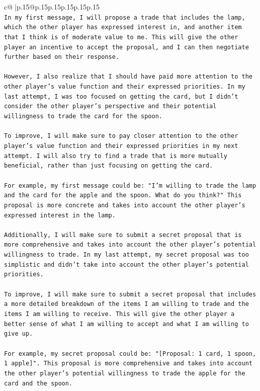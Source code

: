 \documentclass{article}
\begin{document}
{\begin{supertabular}{c@{$\;$}|p{.15\linewidth}@{}p{.15\linewidth}p{.15\linewidth}p{.15\linewidth}p{.15\linewidth}p{.15\linewidth}}
{{{\\ 
\texttt{In my first message, I will propose a trade that includes the lamp, which the other player has expressed interest in, and another item that I think is of moderate value to me. This will give the other player an incentive to accept the proposal, and I can then negotiate further based on their response.} \\
\\ 
\texttt{However, I also realize that I should have paid more attention to the other player's value function and their expressed priorities. In my last attempt, I was too focused on getting the card, but I didn't consider the other player's perspective and their potential willingness to trade the card for the spoon.} \\
\\ 
\texttt{To improve, I will make sure to pay closer attention to the other player's value function and their expressed priorities in my next attempt. I will also try to find a trade that is more mutually beneficial, rather than just focusing on getting the card.} \\
\\ 
\texttt{For example, my first message could be: "I'm willing to trade the lamp and the card for the apple and the spoon. What do you think?" This proposal is more concrete and takes into account the other player's expressed interest in the lamp.} \\
\\ 
\texttt{Additionally, I will make sure to submit a secret proposal that is more comprehensive and takes into account the other player's potential willingness to trade. In my last attempt, my secret proposal was too simplistic and didn't take into account the other player's potential priorities.} \\
\\ 
\texttt{To improve, I will make sure to submit a secret proposal that includes a more detailed breakdown of the items I am willing to trade and the items I am willing to receive. This will give the other player a better sense of what I am willing to accept and what I am willing to give up.} \\
\\ 
\texttt{For example, my secret proposal could be: "{[}Proposal: 1 card, 1 spoon, 1 apple{]}". This proposal is more comprehensive and takes into account the other player's potential willingness to trade the apple for the card and the spoon.} \\
\\ 
}}}
\end{supertabular}}
\end{document}
